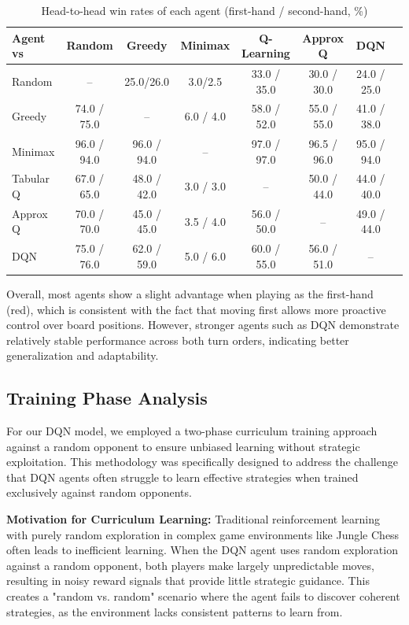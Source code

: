 \documentclass{article}
\begin{document}
\begin{table}[H]
  \caption{Head-to-head win rates of each agent (first-hand / second-hand, \%)}
  \label{tab:head_to_head}
  \centering
  \begin{tabular}{lccccccc}
    \toprule
    Agent vs & Random & Greedy & Minimax &  Q-Learning & Approx Q & DQN \\
    \midrule
    Random & -- & 25.0/26.0 & 3.0/2.5 & 33.0 / 35.0 & 30.0 / 30.0 & 24.0 / 25.0 \\
    Greedy & 74.0 / 75.0 & -- & 6.0 / 4.0 & 58.0 / 52.0 & 55.0 / 55.0 & 41.0 / 38.0  \\
    Minimax & 96.0 / 94.0 & 96.0 / 94.0 & -- & 97.0 / 97.0 & 96.5 / 96.0 & 95.0 / 94.0 \\
    Tabular Q & 67.0 / 65.0 & 48.0 / 42.0 & 3.0 / 3.0 & -- & 50.0 / 44.0 & 44.0 / 40.0 \\
    Approx Q & 70.0 / 70.0 & 45.0 / 45.0 & 3.5 / 4.0 & 56.0 / 50.0 & -- & 49.0 / 44.0  \\
    DQN & 75.0 / 76.0 & 62.0 / 59.0 & 5.0 / 6.0 & 60.0 / 55.0 & 56.0 / 51.0 & --  \\
    \bottomrule
  \end{tabular}
\end{table}

Overall, most agents show a slight advantage when playing as the first-hand (red), which is consistent with the fact that moving first allows more proactive control over board positions. However, stronger agents such as DQN demonstrate relatively stable performance across both turn orders, indicating better generalization and adaptability.




\subsection{Training Phase Analysis}

For our DQN model, we employed a two-phase curriculum training approach against a random opponent to ensure unbiased learning without strategic exploitation. This methodology was specifically designed to address the challenge that DQN agents often struggle to learn effective strategies when trained exclusively against random opponents.

\textbf{Motivation for Curriculum Learning:} Traditional reinforcement learning with purely random exploration in complex game environments like Jungle Chess often leads to inefficient learning. When the DQN agent uses random exploration against a random opponent, both players make largely unpredictable moves, resulting in noisy reward signals that provide little strategic guidance. This creates a "random vs. random" scenario where the agent fails to discover coherent strategies, as the environment lacks consistent patterns to learn from.
\end{document}
